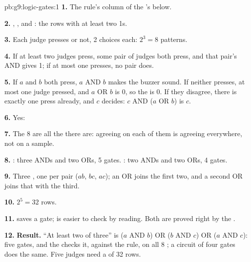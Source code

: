 \begin{solution}{pb:g9:logic-gates:1}
\textbf{1.} The rule's column of the 's  below.

\textbf{2.} , ,  and : the
rows with at least two 1s.

\textbf{3.} Each judge presses or not, 2 choices each: $2^3 = 8$ patterns.

\textbf{4.} If at least two judges press, some pair of judges both press, and
that pair's AND gives 1; if at most one presses, no pair does.

\textbf{5.} If $a$ and $b$ both press, $a$ AND $b$ makes the buzzer sound. If
neither presses, at most one judge pressed, and $a$ OR $b$ is 0, so the 
is 0. If they disagree, there is exactly one press already, and $c$ decides:
$c$ AND ($a$ OR $b$) is $c$.

\textbf{6.} Yes:

\label{out:g9:logic-gates:judges}

\textbf{7.} The 8  are all the  there are: agreeing on each of them
is agreeing everywhere, not on a sample.

\textbf{8.} : three ANDs and two ORs, 5 gates. : two
ANDs and two ORs, 4 gates.

\textbf{9.} Three , one per pair ($a b$, $b c$, $a c$); an OR joins the
first two, and a second OR joins that with the third.

\textbf{10.} $2^5 = 32$ rows.

\textbf{11.}  saves a gate;  is easier to check by
reading. Both are proved right by the .

\textbf{12.} \textbf{Result.} ``At least two of three'' is
($a$ AND $b$) OR ($b$ AND $c$) OR ($a$ AND $c$): five  gates, and the
 checks it, against the rule, on all 8 ; a circuit of four gates
does the same. Five judges need a  of 32 rows.
\end{solution}
